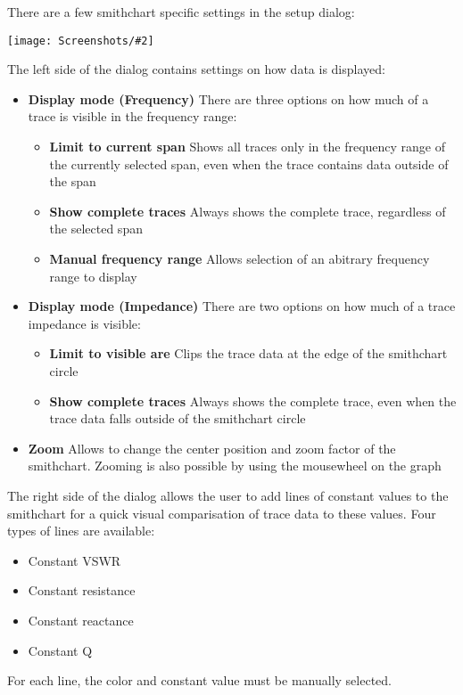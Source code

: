 \documentclass[a4paper,11pt]{article}
\newcommand{\screenshot}[2]{\begin{center}
\texttt{[image: Screenshots/\#2]}
\end{center}}
\begin{document}
There are a few smithchart specific settings in the setup dialog:
\screenshot{1.0}{GraphSmithchartSetup.png}
The left side of the dialog contains settings on how data is displayed:
\begin{itemize}
\item \textbf{Display mode (Frequency)} There are three options on how much of a trace is visible in the frequency range:
\begin{itemize}
\item \textbf{Limit to current span} Shows all traces only in the frequency range of the currently selected span, even when the trace contains data outside of the span
\item \textbf{Show complete traces} Always shows the complete trace, regardless of the selected span
\item \textbf{Manual frequency range} Allows selection of an abitrary frequency range to display
\end{itemize}
\item \textbf{Display mode (Impedance)} There are two options on how much of a trace impedance is visible:
\begin{itemize}
\item \textbf{Limit to visible are} Clips the trace data at the edge of the smithchart circle
\item \textbf{Show complete traces} Always shows the complete trace, even when the trace data falls outside of the smithchart circle
\end{itemize}
\item \textbf{Zoom} Allows to change the center position and zoom factor of the smithchart. Zooming is also possible by using the mousewheel on the graph
\end{itemize}

The right side of the dialog allows the user to add lines of constant values to the smithchart for a quick visual comparisation of trace data to these values. Four types of lines are available:
\begin{itemize}
\item Constant VSWR
\item Constant resistance
\item Constant reactance
\item Constant Q
\end{itemize}
For each line, the color and constant value must be manually selected.
\end{document}
